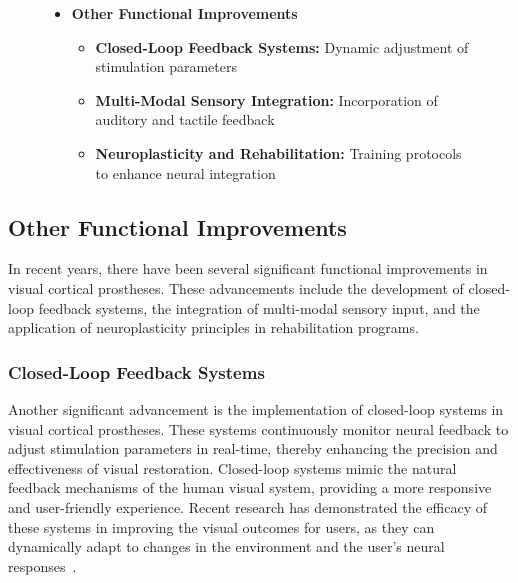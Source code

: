 \documentclass[twocolumn,10pt]{article}
\begin{document}
\begin{figure}[htbp]
\begin{tcolorbox}
\begin{itemize}
                  \item \textbf{Other Functional Improvements}
                        \begin{itemize}
                              \item \textbf{Closed-Loop Feedback Systems:} Dynamic adjustment of stimulation parameters
                              \item \textbf{Multi-Modal Sensory Integration:} Incorporation of auditory and tactile feedback
                              \item \textbf{Neuroplasticity and Rehabilitation:} Training protocols to enhance neural integration
                        \end{itemize}
            \end{itemize}
      \end{tcolorbox}
\end{figure}

\subsection*{Other Functional Improvements}
In recent years, there have been several significant functional improvements in
visual cortical prostheses. These advancements include the development of
closed-loop feedback systems, the integration of multi-modal sensory input, and
the application of neuroplasticity principles in rehabilitation programs.

\subsubsection*{Closed-Loop Feedback Systems}
Another significant advancement is the implementation of closed-loop systems in
visual cortical prostheses. These systems continuously monitor neural feedback
to adjust stimulation parameters in real-time, thereby enhancing the precision
and effectiveness of visual restoration. Closed-loop systems mimic the natural
feedback mechanisms of the human visual system, providing a more responsive and
user-friendly experience. Recent research has demonstrated the efficacy of these
systems in improving the visual outcomes for users, as they can dynamically
adapt to changes in the environment and the user's neural
responses~\parencite{leviEditorialClosedLoopSystems2018}.
\end{document}

